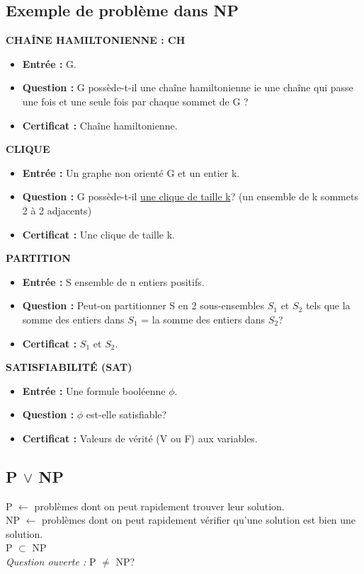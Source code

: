 \documentclass[12pt,a4paper]{article}
\begin{document}
\subsection{Exemple de problème dans NP}
\textbf{\Large CHAÎNE HAMILTONIENNE : CH}\\
\begin{itemize}
	\item \textbf{Entrée :} G.
	\item \textbf{Question :} G possède-t-il une chaîne hamiltonienne ie une chaîne qui passe une fois et une seule fois par chaque sommet de G ?
	\item \textbf{Certificat :} Chaîne hamiltonienne.\\
\end{itemize}
\textbf{\Large CLIQUE}\\
\begin{itemize}
	\item \textbf{Entrée :} Un graphe non orienté G et un entier k.
	\item \textbf{Question :} G possède-t-il \underline{une clique de taille k}? (un ensemble de k sommets 2 à 2 adjacents)
	\item \textbf{Certificat :} Une clique de taille k.\\
\end{itemize}
\textbf{\Large PARTITION}\\
\begin{itemize}
	\item \textbf{Entrée :} S ensemble de n entiers positifs.
	\item \textbf{Question :} Peut-on partitionner S en 2 sous-ensembles $S_1$ et $S_2$ tels que la somme des entiers dans $S_1$ = la somme des entiers dans $S_2$?
	\item \textbf{Certificat :} $S_1$ et $S_2$.\\
\end{itemize}
\textbf{\Large SATISFIABILITÉ (SAT)}\\
\begin{itemize}
	\item \textbf{Entrée :} Une formule booléenne $\phi$.
	\item \textbf{Question :} $\phi$ est-elle satisfiable?
	\item \textbf{Certificat :} Valeurs de vérité (V ou F) aux variables.\\
\end{itemize}
\subsection{P $\lor$ NP}
P $\leftarrow$ problèmes dont on peut rapidement trouver leur solution.\\
NP $\leftarrow$ problèmes dont on peut rapidement vérifier qu'une solution est bien une solution.\\
P $\subset$ NP\\
\textit{Question ouverte : } P $\neq$ NP?
\end{document}
